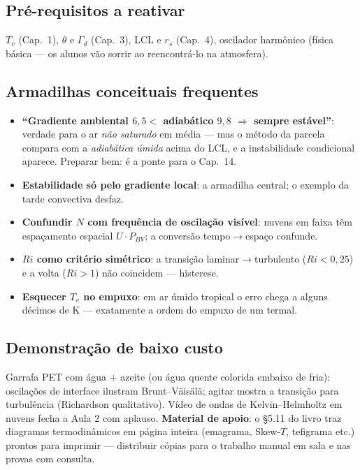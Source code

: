 \subsection*{Pré-requisitos a reativar}

$T_v$ (Cap.~1), $\theta$ e $\Gamma_d$ (Cap.~3), LCL e $r_s$ (Cap.~4),
oscilador harmônico (física básica — os alunos vão sorrir ao reencontrá-lo
na atmosfera).

\subsection*{Armadilhas conceituais frequentes}

\begin{itemize}
  \item \textbf{``Gradiente ambiental $6{,}5 <$ adiabático $9{,}8$ $\Rightarrow$
        sempre estável''}: verdade para o ar \emph{não saturado} em média —
        mas o método da parcela compara com a \emph{adiabática úmida} acima
        do LCL, e a instabilidade condicional aparece. Preparar bem: é a
        ponte para o Cap.~14.
  \item \textbf{Estabilidade só pelo gradiente local}: a armadilha central;
        o exemplo da tarde convectiva desfaz.
  \item \textbf{Confundir $N$ com frequência de oscilação visível}: nuvens
        em faixa têm espaçamento espacial $U\cdot P_{BV}$; a conversão
        tempo$\to$espaço confunde.
  \item \textbf{$Ri$ como critério simétrico}: a transição
        laminar$\to$turbulento ($Ri<0{,}25$) e a volta ($Ri>1$) não
        coincidem — histerese.
  \item \textbf{Esquecer $T_v$ no empuxo}: em ar úmido tropical o erro
        chega a alguns décimos de K — exatamente a ordem do empuxo de um
        termal.
\end{itemize}

\subsection*{Demonstração de baixo custo}

Garrafa PET com água + azeite (ou água quente colorida embaixo de fria):
oscilações de interface ilustram Brunt--Väisälä; agitar mostra a transição
para turbulência (Richardson qualitativo). Vídeo de ondas de
Kelvin--Helmholtz em nuvens fecha a Aula 2 com aplauso.
\textbf{Material de apoio}: o \S5.11 do livro traz diagramas
termodinâmicos em página inteira (emagrama, Skew-$T$, tefigrama etc.)
prontos para imprimir — distribuir cópias para o trabalho manual em
sala e nas provas com consulta.


